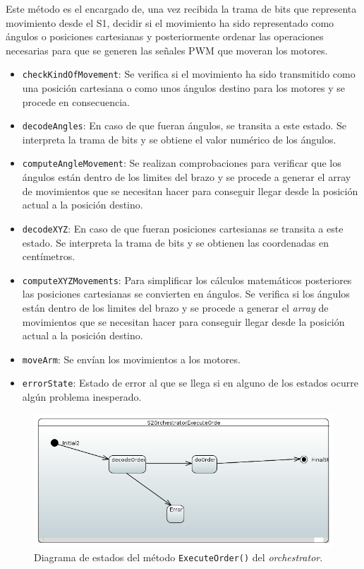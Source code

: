 Este método es el encargado de, una vez recibida la trama de bits que representa movimiento desde el S1, decidir si el movimiento ha sido representado como ángulos o posiciones cartesianas y posteriormente ordenar las operaciones necesarias para que se generen las señales PWM que moveran los motores.

\begin{itemize}
    \item \texttt{checkKindOfMovement}: Se verifica si el movimiento ha sido transmitido como una posición cartesiana o como unos ángulos destino para los motores y se procede en consecuencia.
    \item \texttt{decodeAngles}: En caso de que fueran ángulos, se transita a este estado. Se interpreta la trama de bits y se obtiene el valor numérico de los ángulos.
    \item \texttt{computeAngleMovement}: Se realizan comprobaciones para verificar que los ángulos están dentro de los limites del brazo y se procede a generar el array de movimientos que se necesitan hacer para conseguir llegar desde la posición actual a la posición destino.
    \item \texttt{decodeXYZ}: En caso de que fueran posiciones cartesianas se transita a este estado. Se interpreta la trama de bits y se obtienen las coordenadas en centímetros.
    \item \texttt{computeXYZMovements}: Para simplificar los cálculos matemáticos posteriores las posiciones cartesianas se convierten en ángulos. Se verifica si los ángulos están dentro de los limites del brazo y se procede a generar el \textit{array} de movimientos que se necesitan hacer para conseguir llegar desde la posición actual a la posición destino.
    \item \texttt{moveArm}: Se envían los movimientos a los motores.
    \item \texttt{errorState}: Estado de error al que se llega si en alguno de los estados ocurre algún problema inesperado. 
    
\end{itemize}

\begin{figure}[H]
    \centering
    \includegraphics[width=1\linewidth]{pictures/S2OrchestratorExecuteOrder.PNG}
    \caption{Diagrama de estados del método \texttt{ExecuteOrder()} del \textit{orchestrator}.}
    \label{fig:fun_execute_order_orchestator}
\end{figure}

